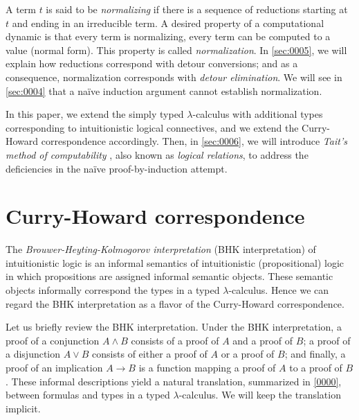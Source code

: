 \documentclass[a4paper]{article}
\begin{document}
A term $t$ is said to be \emph{normalizing} if there is a sequence of reductions starting at $t$ and ending in an irreducible term.
A desired property of a computational dynamic is that every term is normalizing, \ie every term can be computed to a value (\ie normal form).
This property is called \emph{normalization}.
In \cref{sec:0005}, we will explain how reductions correspond with detour conversions; and as a consequence, normalization corresponds with \emph{detour elimination}.
We will see in \cref{sec:0004} that a na\"ive induction argument cannot establish normalization.

In this paper, we extend the simply typed $\lambda$-calculus with additional types corresponding to intuitionistic logical connectives, and we extend the Curry-Howard correspondence accordingly.
Then, in \cref{sec:0006}, we will introduce \emph{Tait's method of computability} \cite{Tait67,Plotkin73}, also known as \emph{logical relations}, to address the deficiencies in the na\"ive proof-by-induction attempt.




\section{Curry-Howard correspondence}
\label{sec:0001}

The \emph{Brouwer-Heyting-Kolmogorov interpretation} (BHK interpretation) of intuitionistic logic is an informal semantics of intuitionistic (propositional) logic in which propositions are assigned informal semantic objects.
These semantic objects informally correspond the types in a typed $\lambda$-calculus.
Hence we can regard the BHK interpretation as a flavor of the Curry-Howard correspondence.

Let us briefly review the BHK interpretation.
Under the BHK interpretation, a proof of a conjunction $A \wedge B$ consists of a proof of $A$ and a proof of $B$; a proof of a disjunction $A \vee B$ consists of either a proof of $A$ or a proof of $B$; and finally, a proof of an implication $A \to B$ is a function mapping a proof of $A$ to a proof of $B$.
These informal descriptions yield a natural translation, summarized in \cref{0000}, between formulas and types in a typed $\lambda$-calculus.
We will keep the translation implicit.
\end{document}
